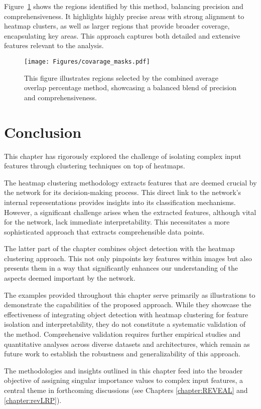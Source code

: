 Figure~\ref{Fig:covarage_masks} shows the regions identified by this method, balancing precision and comprehensiveness. It highlights highly precise areas with strong alignment to heatmap clusters, as well as larger regions that provide broader coverage, encapsulating key areas. This approach captures both detailed and extensive features relevant to the analysis.
\begin{figure}[ht!]
\begin{center}
\texttt{[image: Figures/covarage\_masks.pdf]}
\end{center}
\caption{This figure illustrates regions selected by the combined average overlap percentage method, showcasing a balanced blend of precision and comprehensiveness.}
\label{Fig:covarage_masks}
\end{figure} 



\section{Conclusion}

This chapter has rigorously explored the challenge of isolating complex input features through clustering techniques on top of heatmaps. 

The heatmap clustering methodology extracts features that are deemed crucial by the network for its decision-making process. This direct link to the network’s internal representations provides insights into its classification mechanisms. However, a significant challenge arises when the extracted features, although vital for the network, lack immediate interpretability. This necessitates a more sophisticated approach that extracts comprehensible data points.

The latter part of the chapter combines object detection with the heatmap clustering approach. This not only pinpoints key features within images but also presents them in a way that significantly enhances our understanding of the aspects deemed important by the network.

The examples provided throughout this chapter serve primarily as illustrations to demonstrate the capabilities of the proposed approach. While they showcase the effectiveness of integrating object detection with heatmap clustering for feature isolation and interpretability, they do not constitute a systematic validation of the method. Comprehensive validation requires further empirical studies and quantitative analyses across diverse datasets and architectures, which remain as future work to establish the robustness and generalizability of this approach.

The methodologies and insights outlined in this chapter feed into the broader objective of assigning singular importance values to complex input features, a central theme in forthcoming discussions (see Chapters \ref{chapter:REVEAL} and \ref{chapter:revLRP}).
